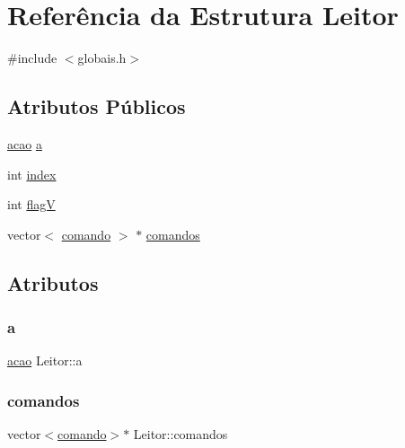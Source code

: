 \hypertarget{struct_leitor}{}\section{Referência da Estrutura Leitor}
\label{struct_leitor}


{\ttfamily \#include $<$globais.\+h$>$}

\subsection*{Atributos Públicos}
\begin{DoxyCompactItemize}
\item 
\hyperlink{globais_8h_a76052629e48141888c06970a0be324d2}{acao} \hyperlink{struct_leitor_ad66a668accc64eece6867d53fa9eb9cf}{a}
\item 
int \hyperlink{struct_leitor_a5591befb6df369eed6b23e33520857c1}{index}
\item 
int \hyperlink{struct_leitor_a9a9c238f52f53e89c260aa9eb62c0c93}{flagV}
\item 
vector$<$ \hyperlink{globais_8h_a64e5f15415f41c3c1fcc9dad6a3d1ed5}{comando} $>$ $\ast$ \hyperlink{struct_leitor_a4563b8be860f09a609456b56a72b5893}{comandos}
\end{DoxyCompactItemize}


\subsection{Atributos}
\mbox{\label{struct_leitor_ad66a668accc64eece6867d53fa9eb9cf}} 
\subsubsection{\texorpdfstring{a}{a}}
{\footnotesize\ttfamily \hyperlink{globais_8h_a76052629e48141888c06970a0be324d2}{acao} Leitor\+::a}

\mbox{\label{struct_leitor_a4563b8be860f09a609456b56a72b5893}} 
\subsubsection{\texorpdfstring{comandos}{comandos}}
{\footnotesize\ttfamily vector$<$\hyperlink{globais_8h_a64e5f15415f41c3c1fcc9dad6a3d1ed5}{comando}$>$$\ast$ Leitor\+::comandos}

